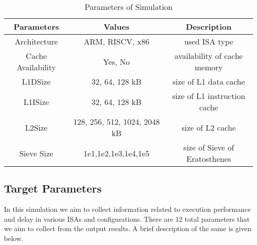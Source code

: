 \begin{table}[ht]
\centering
\begin{tabular}{|c|c|c|}
    \hline
    Parameters          & Values                            & Description\\ \hline
    Architecture        & ARM, RISCV, x86                   & used ISA type  \\ 
    Cache Availability  & Yes, No                           & availability of cache memory \\
    L1DSize             & 32, 64, 128 kB                    & size of L1 data cache \\
    L1ISize             & 32, 64, 128 kB                    & size of L1 instruction cache\\
    L2Size              & 128, 256, 512, 1024, 2048 kB      & size of L2 cache \\ 
    Sieve Size          & 1e1,1e2,1e3,1e4,1e5  &  size of Sieve of Eratosthenes\\ \hline
    \end{tabular}
    \caption{Parameters of Simulation}
\end{table}

\subsection{Target Parameters}
In this simulation we aim to collect information related to execution performance and delay in various ISAs
and configurations. There are 12 total parameters that we aim to collect from the output results. A brief 
description of the same is given below.

